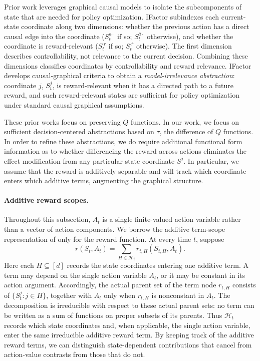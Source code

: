 \documentclass[opre,nonblindrev]{informs4}
\newenvironment{revision}{\begingroup\color{revisionblue}\ignorespaces}{\endgroup}
\newcommand{\blipadv}{\tau}
\begin{document}
\begin{revision}
Prior work leverages graphical causal models to isolate the subcomponents of state that are needed for policy optimization. IFactor \citep{liu2023} subindexes each current-state coordinate along two dimensions: whether the previous action has a direct causal edge into the coordinate (\(S_t^{a\cdot}\) if so; \(S_t^{\bar a\cdot}\) otherwise), and whether the coordinate is reward-relevant (\(S_t^{\cdot r}\) if so; \(S_t^{\cdot\bar r}\) otherwise). The first dimension describes controllability, not relevance to the current decision. Combining these dimensions classifies coordinates by controllability and reward relevance. IFactor develops causal-graphical criteria to obtain a \textit{model-irrelevance abstraction}: coordinate $j$, \(S_t^j\), is reward-relevant when it has a directed path to a
future reward, and such reward-relevant states are sufficient for
policy optimization under standard causal graphical assumptions. 

These prior works focus on preserving $Q$ functions. In our work, we focus on sufficient decision-centered abstractions based on $\blipadv$, the difference of $Q$ functions. In order to refine these abstractions, we do require additional functional form information as to whether differencing the reward across actions eliminates the effect modification from any particular state coordinate $S^j$. In particular, we assume that the reward is additively separable and will track which coordinate enters which additive terms, augmenting the graphical structure.
\paragraph{Additive reward scopes.}
Throughout this subsection, \(A_t\) is a single finite-valued action
variable rather than a vector of action components. We borrow the additive
term-scope representation of \citet{enouen2025higher} only for the reward
function. At every time \(t\), suppose
\begin{equation}
 r(S_t,A_t)
 =
 \sum_{H\in\mathcal H_t}
 r_{t,H}(S_{t,H},A_t).
 \label{eq:additive-reward-scopes}
\end{equation}
Here each \(H\subseteq[d]\) records the state coordinates entering one
additive term. A term may depend on the single action variable \(A_t\), or it
may be constant in its action argument. Accordingly, the actual parent set
of the term node \(r_{t,H}\) consists of \(\{S_t^j:j\in H\}\), together with
\(A_t\) only when \(r_{t,H}\) is nonconstant in \(A_t\). The decomposition
is irreducible with respect to these actual parent sets: no term can be
written as a sum of functions on proper subsets of its parents. Thus
\(\mathcal H_t\) records which state coordinates and, when applicable, the
single action variable, enter the same irreducible additive reward term. By keeping track of the additive reward terms, we can distinguish
state-dependent contributions that cancel from action-value contrasts from
those that do not. 



\end{revision}
\end{document}

